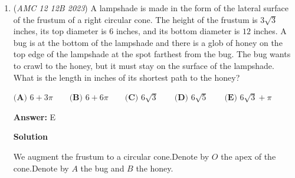 \begin{enumerate}
 The total displacement from the starting position is $z_3 = z_1 + z_2 = 2e^{ia} + 2e^{ib}$.

 
We need to find the condition under which $|z_3| <= 1$. This translates to:
 \[|2e^{ia} + 2e^{ib}| <= 1\]

 \[|e^{ia} + e^{ib}| <= \frac{1}{2}\]

 \[e^{ia} + e^{ib} = \cos(a) + i\sin(a) + \cos(b) + i\sin(b)\]
 \[= (\cos(a) + \cos(b)) + i(\sin(a) + \sin(b))\]

 The magnitude squared of this sum is:
 \[|e^{ia} + e^{ib}|^2 = (\cos(a) + \cos(b))^2 + (\sin(a) + \sin(b))^2\]
 \[= \cos^2(a) + 2\cos(a)\cos(b) + \cos^2(b) + \sin^2(a) + 2\sin(a)\sin(b) + \sin^2(b)\]
 \[= 2 + 2(\cos(a)\cos(b) + \sin(a)\sin(b))\]
 \[= 2 + 2\cos(a - b)\]

 Thus:
 \[2 + 2\cos(a - b) <= \frac{1}{4}\]
 \[2\cos(a - b) <= -\frac{7}{4}\]
 \[\cos(a - b) <= -\frac{7}{8}\]

 Therefore, our desired answer would be $\frac{\arccos{\frac{7}{8}}}{\pi}$ (the angle we want divided by $2\pi$). Since

 
 \[\arccos{\frac{7}{8}}=\arccos{(1-2 \cdot (\frac{1}{4})^{2})}=2\arcsin{\frac{1}{4}}\]

 where the last step holds by the double angle formula, our answer is $\boxed{(E)\frac{2\arcsin{\frac{1}{4}}}{\pi}}$.

 


	\item (\textit{AMC 12 12B 2023}) A lampshade is made in the form of the lateral surface of the frustum of a right circular cone. The height of the frustum is $3\sqrt3$ inches, its top diameter is $6$ inches, and its bottom diameter is $12$ inches. A bug is at the bottom of the lampshade and there is a glob of honey on the top edge of the lampshade at the spot farthest from the bug. The bug wants to crawl to the honey, but it must stay on the surface of the lampshade. What is the length in inches of its shortest path to the honey?


 $\textbf{(A) } 6 + 3\pi\qquad \textbf{(B) }6 + 6\pi\qquad \textbf{(C) } 6\sqrt3 \qquad \textbf{(D) } 6\sqrt5 \qquad \textbf{(E) } 6\sqrt3 + \pi$

 \textbf{Answer: }E



\textbf{Solution}

We augment the frustum to a circular cone.Denote by $O$ the apex of the cone.Denote by $A$ the bug and $B$ the honey.


\end{enumerate}
